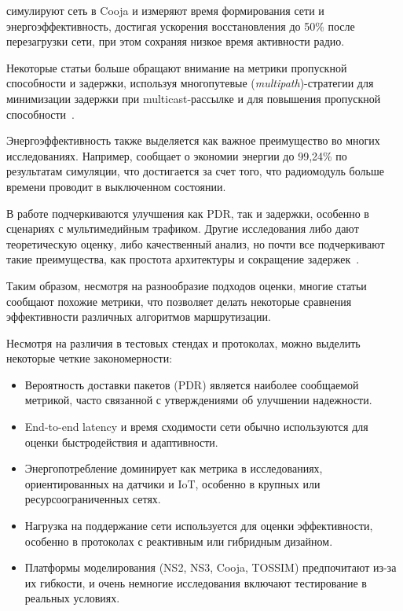 \documentclass[%
]{report}
\begin{document}
\textcite{HECK2025110364} симулируют сеть в
Cooja и измеряют время формирования сети
и энергоэффективность, достигая ускорения восстановления
до 50\% после
перезагрузки сети,
при этом сохраняя низкое время активности радио.

Некоторые статьи больше обращают внимание на метрики
пропускной способности и задержки,
используя многопутевые (\emph{multipath})-стратегии для минимизации
задержки при multicast-рассылке и для повышения
пропускной способности~\cite{KUMAR2012481,LI2011458}.

Энергоэффективность также выделяется как важное
преимущество во многих исследованиях. Например,
\textcite{HERNANDEZSOLANA2022109114} сообщает
о экономии энергии до 99,24\% по результатам
симуляции, что достигается за счет
того, что радиомодуль больше времени проводит в выключенном состоянии.

В работе \textcite{PAN2012952} подчеркиваются
улучшения как PDR, так и задержки,
особенно в сценариях с мультимедийным трафиком.
Другие исследования либо дают теоретическую оценку,
либо качественный анализ,
но почти все подчеркивают такие преимущества,
как простота архитектуры и сокращение задержек~\cite{ALVAREZ2008240,DIIANNI1998131}.

Таким образом, несмотря на разнообразие подходов
оценки, многие статьи сообщают похожие метрики,
что позволяет делать некоторые сравнения
эффективности различных алгоритмов
маршрутизации.

Несмотря на различия в тестовых стендах и протоколах, можно выделить некоторые четкие закономерности:

\begin{itemize}
\item    Вероятность доставки пакетов (PDR)
является наиболее сообщаемой метрикой,
часто связанной с утверждениями об улучшении надежности.
\item    End-to-end latency
и время сходимости сети обычно
используются для оценки быстродействия и адаптивности.
\item    Энергопотребление доминирует
как метрика в исследованиях,
ориентированных на датчики и IoT,
особенно в крупных или ресурсоограниченных сетях.
\item    Нагрузка на поддержание сети
используется для оценки эффективности, особенно в протоколах
с реактивным или гибридным дизайном.
\item    Платформы моделирования
(NS2, NS3, Cooja, TOSSIM) предпочитают из-за их
гибкости, и очень немногие исследования включают
тестирование в реальных условиях.
\end{itemize}
\end{document}
